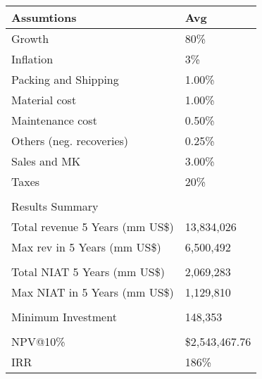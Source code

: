 \begin{tabular}{ll}
\hline
 Assumtions                     & Avg           \\
\hline
 Growth                         & 80\%           \\
 Inflation                      & 3\%            \\
 Packing and Shipping           & 1.00\%         \\
 Material cost                  & 1.00\%         \\
 Maintenance cost               & 0.50\%         \\
 Others (neg. recoveries)       & 0.25\%         \\
 Sales and MK                   & 3.00\%         \\
 Taxes                          & 20\%           \\
                                &               \\
 Results Summary                &               \\
 Total revenue 5 Years (mm US\$) & 13,834,026    \\
 Max rev in 5 Years (mm US\$)    & 6,500,492     \\
                                &               \\
 Total NIAT 5 Years (mm US\$)    & 2,069,283     \\
 Max NIAT in 5 Years (mm US\$)   & 1,129,810     \\
                                &               \\
 Minimum Investment             & 148,353       \\
                                &               \\
 NPV@10\%                        & \$2,543,467.76 \\
 IRR                            & 186\%          \\
\hline
\end{tabular}